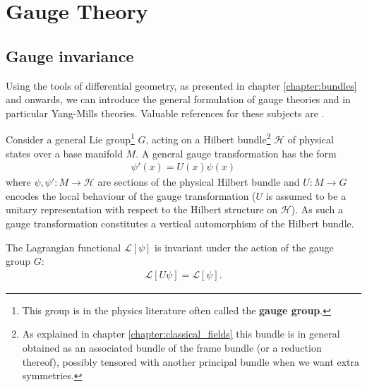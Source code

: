 \chapter{Gauge Theory}\label{chapter:gauge_theory}

\section{Gauge invariance}

    Using the tools of differential geometry, as presented in chapter \ref{chapter:bundles} and onwards, we can introduce the general formulation of gauge theories and in particular Yang-Mills theories. Valuable references for these subjects are \cite{principal_bundles,sen_nash,schuller,gauge1}.

    Consider a general Lie group\footnote{This group is in the physics literature often called the \textbf{gauge group}.} $G$, acting on a Hilbert bundle\footnote{As explained in chapter \ref{chapter:classical_fields} this bundle is in general obtained as an associated bundle of the frame bundle (or a reduction thereof), possibly tensored with another principal bundle when we want extra symmetries.} $\mathcal{H}$ of physical states over a base manifold $M$. A general gauge transformation has the form
    \begin{gather}
        \label{qft:gauge_transformation}
        \psi'(x) = U(x)\psi(x)
    \end{gather}
    where $\psi, \psi':M\rightarrow\mathcal{H}$ are sections of the physical Hilbert bundle and $U:M\rightarrow G$ encodes the local behaviour of the gauge transformation ($U$ is assumed to be a unitary representation with respect to the Hilbert structure on $\mathcal{H}$). As such a gauge transformation constitutes a vertical automorphism of the Hilbert bundle.

    \begin{axiom}
        The Lagrangian functional $\mathcal{L}[\psi]$ is invariant under the action of the gauge group $G$:
        \begin{gather}
            \mathcal{L}[U\psi] = \mathcal{L}[\psi].
        \end{gather}
    \end{axiom}

